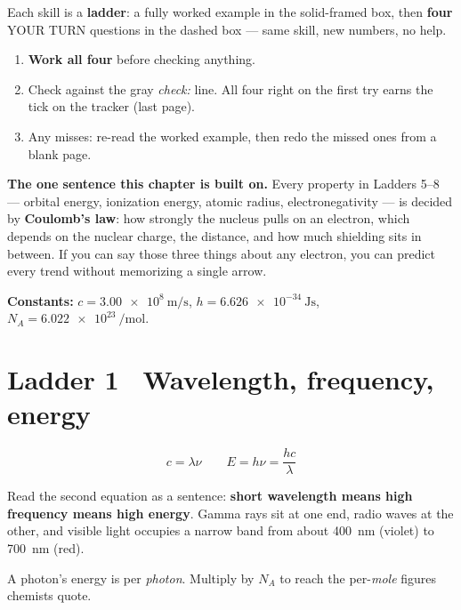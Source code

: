 \documentclass{apchem-worksheet}
\begin{document}
\apctitleblock

\begin{apcnote}
Each skill is a \textbf{ladder}: a fully worked example in the
solid-framed box, then \textbf{four} YOUR TURN questions in the dashed
box --- same skill, new numbers, no help.

\begin{enumerate}[leftmargin=*,itemsep=0.15em]
  \item \textbf{Work all four} before checking anything.
  \item Check against the gray \emph{check:} line. All four right on the
        first try earns the tick on the tracker (last page).
  \item Any misses: re-read the worked example, then redo the missed ones
        from a blank page.
\end{enumerate}

\textbf{The one sentence this chapter is built on.} Every property in
Ladders 5--8 --- orbital energy, ionization energy, atomic radius,
electronegativity --- is decided by \textbf{Coulomb's law}: how strongly
the nucleus pulls on an electron, which depends on the nuclear charge,
the distance, and how much shielding sits in between. If you can say
those three things about any electron, you can predict every trend
without memorizing a single arrow.

\textbf{Constants:} $c = \SI{3.00e8}{\meter\per\second}$,
$h = \SI{6.626e-34}{\joule\second}$,
$N_A = \SI{6.022e23}{\per\mole}$.
\end{apcnote}

\section*{\sffamily Ladder 1 \textbullet\ Wavelength, frequency, energy}

\[ c = \lambda\nu \qquad E = h\nu = \frac{hc}{\lambda} \]

Read the second equation as a sentence: \textbf{short wavelength means
high frequency means high energy}. Gamma rays sit at one end, radio waves
at the other, and visible light occupies a narrow band from about
\SI{400}{\nano\meter} (violet) to \SI{700}{\nano\meter} (red).

A photon's energy is per \emph{photon}. Multiply by $N_A$ to reach the
per-\emph{mole} figures chemists quote.
\end{document}
